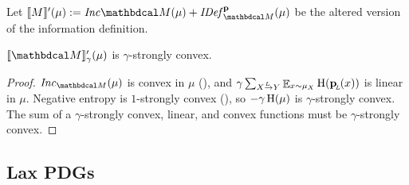 \documentclass{article}
\begin{document}
\begin{defn}
	Let $\bbr{M}'(\mu) := \Inc{\dg M}(\mu) + \IDef{\dg M}^{\mat p}(\mu)$ be the altered version of the information definition.
\end{defn}
\begin{prop}\label{prop:u-convex}
$\bbr{\dg M}'_\gamma(\mu)$ is $\gamma$-strongly convex.%
\end{prop}
\begin{proof}
	$\Inc_{\dg M}( \mu)$ is convex in $\mu$
	(), and $\gamma\sum\alle \E_{x\sim \mu_X}
	\H(\bp(x))$ is linear in $\mu$.  
	Negative entropy is $1$-strongly convex
	(), so $- \gamma \operatorname{\mathrm{H}}(\mu)$ is $\gamma$-strongly convex.
	The sum of a $\gamma$-strongly convex, linear, and
	convex functions must be $\gamma$-strongly convex. 
\end{proof}


	\subsection{Lax PDGs}
	
\end{document}

